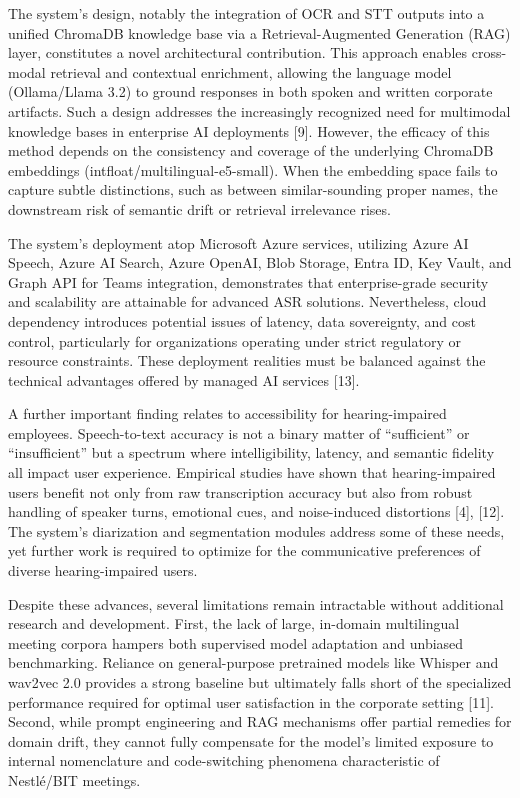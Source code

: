 \documentclass[12pt,a4paper]{article}
\begin{document}
The system’s design, notably the integration of OCR and STT outputs into a unified ChromaDB knowledge base via a Retrieval-Augmented Generation (RAG) layer, constitutes a novel architectural contribution. This approach enables cross-modal retrieval and contextual enrichment, allowing the language model (Ollama/Llama 3.2) to ground responses in both spoken and written corporate artifacts. Such a design addresses the increasingly recognized need for multimodal knowledge bases in enterprise AI deployments [9]. However, the efficacy of this method depends on the consistency and coverage of the underlying ChromaDB embeddings (intfloat/multilingual-e5-small). When the embedding space fails to capture subtle distinctions, such as between similar-sounding proper names, the downstream risk of semantic drift or retrieval irrelevance rises.


The system’s deployment atop Microsoft Azure services, utilizing Azure AI Speech, Azure AI Search, Azure OpenAI, Blob Storage, Entra ID, Key Vault, and Graph API for Teams integration, demonstrates that enterprise-grade security and scalability are attainable for advanced ASR solutions. Nevertheless, cloud dependency introduces potential issues of latency, data sovereignty, and cost control, particularly for organizations operating under strict regulatory or resource constraints. These deployment realities must be balanced against the technical advantages offered by managed AI services [13].


A further important finding relates to accessibility for hearing-impaired employees. Speech-to-text accuracy is not a binary matter of “sufficient” or “insufficient” but a spectrum where intelligibility, latency, and semantic fidelity all impact user experience. Empirical studies have shown that hearing-impaired users benefit not only from raw transcription accuracy but also from robust handling of speaker turns, emotional cues, and noise-induced distortions [4], [12]. The system’s diarization and segmentation modules address some of these needs, yet further work is required to optimize for the communicative preferences of diverse hearing-impaired users.


Despite these advances, several limitations remain intractable without additional research and development. First, the lack of large, in-domain multilingual meeting corpora hampers both supervised model adaptation and unbiased benchmarking. Reliance on general-purpose pretrained models like Whisper and wav2vec 2.0 provides a strong baseline but ultimately falls short of the specialized performance required for optimal user satisfaction in the corporate setting [11]. Second, while prompt engineering and RAG mechanisms offer partial remedies for domain drift, they cannot fully compensate for the model’s limited exposure to internal nomenclature and code-switching phenomena characteristic of Nestlé/BIT meetings.
\end{document}
